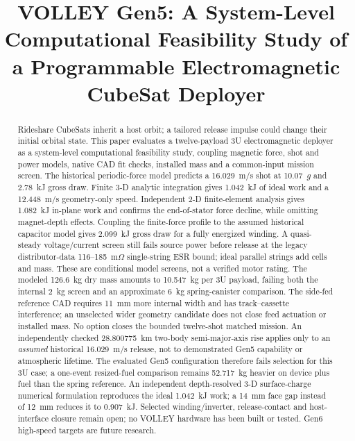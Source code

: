 \documentclass[conference]{IEEEtran}
\begin{document}
\title{VOLLEY Gen5: A System-Level Computational Feasibility Study of a Programmable Electromagnetic CubeSat Deployer}

\author{
}

\maketitle

\begin{abstract}
Rideshare CubeSats inherit a host orbit; a tailored release impulse could change their initial orbital state. This paper evaluates a twelve-payload 3U electromagnetic deployer as a system-level computational feasibility study, coupling magnetic force, shot and power models, native CAD fit checks, installed mass and a common-input mission screen. The historical periodic-force model predicts a 16.029~m/s shot at 10.07~$g$ and 2.78~kJ gross draw. Finite 3-D analytic integration gives 1.042~kJ of ideal work and a 12.448~m/s geometry-only speed. Independent 2-D finite-element analysis gives 1.082~kJ in-plane work and confirms the end-of-stator force decline, while omitting magnet-depth effects. Coupling the finite-force profile to the assumed historical capacitor model gives 2.099~kJ gross draw for a fully energized winding. A quasi-steady voltage/current screen still fails source power before release at the legacy distributor-data 116--185~m$\Omega$ single-string ESR bound; ideal parallel strings add cells and mass. These are conditional model screens, not a verified motor rating. The modeled 126.6~kg dry mass amounts to 10.547~kg per 3U payload, failing both the internal 2~kg screen and an approximate 6~kg spring-canister comparison. The side-fed reference CAD requires 11~mm more internal width and has track--cassette interference; an unselected wider geometry candidate does not close feed actuation or installed mass. No option closes the bounded twelve-shot matched mission. An independently checked 28.800775~km two-body semi-major-axis rise applies only to an \emph{assumed} historical 16.029~m/s release, not to demonstrated Gen5 capability or atmospheric lifetime. The evaluated Gen5 configuration therefore fails selection for this 3U case; a one-event resized-fuel comparison remains 52.717~kg heavier on device plus fuel than the spring reference. An independent depth-resolved 3-D surface-charge numerical formulation reproduces the ideal 1.042~kJ work; a 14~mm face gap instead of 12~mm reduces it to 0.907~kJ. Selected winding/inverter, release-contact and host-interface closure remain open; no VOLLEY hardware has been built or tested. Gen6 high-speed targets are future research.
\end{abstract}
\end{document}
